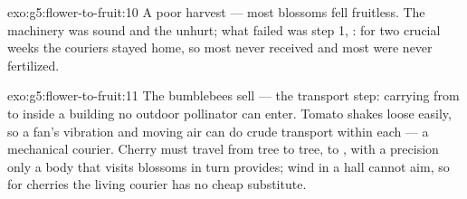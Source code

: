 \begin{solution}{exo:g5:flower-to-fruit:10}
A poor harvest --- most blossoms fell fruitless. The
machinery was sound and the  unhurt; what failed was
step 1, : for two crucial weeks the couriers
stayed home, so most  never received  and most
 were never fertilized.
\end{solution}

\begin{solution}{exo:g5:flower-to-fruit:11}
The bumblebees sell  --- the transport step:
carrying  from  to  inside a building no
outdoor pollinator can enter. Tomato  shakes loose
easily, so a fan's vibration and moving air can do crude
transport within each  --- a mechanical courier. Cherry
 must travel from tree to tree,  to , with
a precision only a body that visits blossoms in turn
provides; wind in a hall cannot aim, so for cherries the
living courier has no cheap substitute.
\end{solution}
